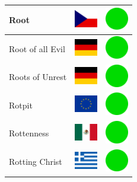 \documentclass[12pt, a4paper, twoside]{report}
\begin{document}
\begin{center}
\begin{longtable}{|p{5cm}|p{2cm}|p{2cm}|}
 Root                                                       & \includegraphics[width=1cm]{../img/flags/cz} &   \includegraphics[width=1cm]{../likes/y} \\ \hline
 Root of all Evil                                           & \includegraphics[width=1cm]{../img/flags/de} &   \includegraphics[width=1cm]{../likes/y} \\ \hline
 Roots of Unrest                                            & \includegraphics[width=1cm]{../img/flags/de} &   \includegraphics[width=1cm]{../likes/y} \\ \hline
 Rotpit                                                     & \includegraphics[width=1cm]{../img/flags/eu} &   \includegraphics[width=1cm]{../likes/y} \\ \hline
 Rottenness                                                 & \includegraphics[width=1cm]{../img/flags/mx} &   \includegraphics[width=1cm]{../likes/y} \\ \hline
 Rotting Christ                                             & \includegraphics[width=1cm]{../img/flags/gr} &   \includegraphics[width=1cm]{../likes/y} \\ \hline

\end{longtable}
\end{center}
\end{document}

